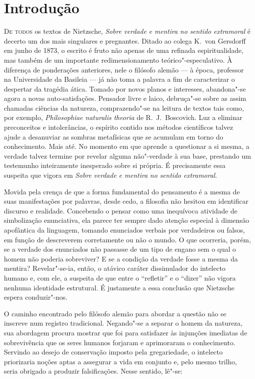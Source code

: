 \chapter[Introdução, por Fernando de Moraes Barros]{Introdução}


\noindent\textsc{De todos} os textos de Nietzsche, \textit{Sobre verdade e mentira no sentido
extramoral} é decerto um dos mais singulares e pregnantes. Ditado ao
colega K.~von Gersdorff em junho de 1873, o escrito é fruto não apenas
de uma refinada espiritualidade, mas também de um importante
redimensionamento teórico"-especulativo. À diferença de ponderações
anteriores, nele o filósofo alemão --- à época, professor na Universidade
da Basileia --- já não toma a palavra a fim de caracterizar o despertar
da tragédia ática. Tomado por novos planos e interesses,
abandona"-se agora a novas auto{}-satisfações. Pensador livre e laico,
debruça"-se sobre as assim chamadas ciências da natureza,
comprazendo"-se na leitura de textos tais como, por exemplo,
\textit{Philosophiae naturalis theoria} de R.~J.~Boscovich. Luz a
eliminar preconceitos e intolerâncias, o espírito contido nos métodos científicos
talvez ajude a desanuviar as sombras metafísicas que se acumulam em
torno do conhecimento. Mais até. No momento em que aprende a questionar
a si mesma, a verdade talvez termine por revelar alguma não"-verdade à
sua base, prestando um testemunho inteiramente inesperado sobre si
própria. É precisamente essa suspeita que vigora em \textit{Sobre
verdade e mentira no sentido extramoral}.

Movida pela crença de que a forma fundamental do pensamento é a mesma
de suas manifestações por palavras, desde cedo, a filosofia não hesitou em
identificar discurso e realidade. Concebendo o pensar como uma
inequívoca atividade de simbolização enunciativa, ela parece ter sempre
dado atenção especial à dimensão apofântica da linguagem, tomando
enunciados verbais por verdadeiros ou falsos, em função de descreverem
corretamente ou não o mundo. O que ocorreria, porém, se a verdade dos
enunciados não passasse de um tipo de engano sem o qual o homem não
poderia sobreviver? E se a condição da verdade fosse a mesma da
mentira? Revelar"-se{}-ia, então, o atávico caráter dissimulador do
intelecto humano e, com ele, a suspeita de que entre o “refletir” e o
“dizer” não vigora nenhuma identidade estrutural. É justamente a essa
conclusão que Nietzsche espera conduzir"-nos.

O caminho encontrado pelo filósofo alemão para abordar a questão
não se inscreve num registro tradicional.
Negando"-se a
separar o homem da natureza, sua abordagem procura mostrar que foi para
satisfazer às injunções imediatas de sobrevivência que os seres humanos
forjaram e aprimoraram o conhecimento. Servindo ao desejo de
conservação imposto pela gregariedade, o intelecto priorizaria noções
aptas a assegurar a vida em conjunto e, pelo mesmo trilho, 
seria obrigado a produzir falsificações. Nesse sentido, 
lê"-se: 

